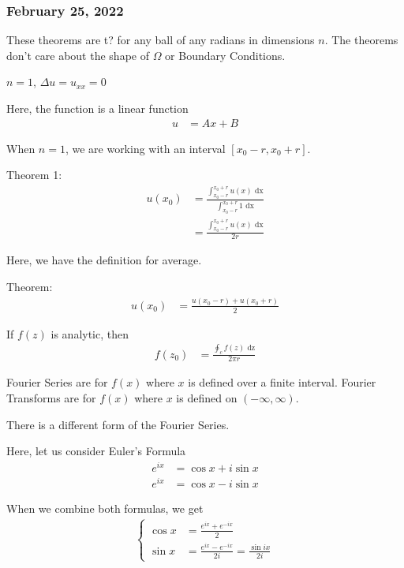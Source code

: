 \newpage

\subsubsection*{February 25, 2022}
\note These theorems are t? for any ball of any radians in dimensions $n$.
The theorems don't care about the shape of $\Omega$ or Boundary Conditions.

\ex $n = 1$, $\Delta u = u_{xx} = 0$

Here, the function is a linear function
%
\begin{align}
  u & = Ax + B
\end{align}

When $n = 1$, we are working with an interval $[x_0 - r, x_0 + r]$.

Theorem 1:
%
\begin{align}
  u(x_0) & = \frac
  {
    \int^{x_0 + r}_{x_0 - r} u(x) \text{ dx}
  }
  {
    \int^{x_0 + r}_{x_0 - r} 1 \text{ dx}
  }\\
  & = \frac
  {
    \int^{x_0 + r}_{x_0 - r} u(x) \text{ dx}
  }
  {
    2r
  }
\end{align}

Here, we have the definition for average.

Theorem:
%
\begin{align}
  u(x_0) & =
  \frac
  {
    u(x_0 - r) + u(x_0 + r)
  }
  {
    2
  }
\end{align}


If $f(z)$ is analytic, then
%
\begin{align}
  f(z_0) & =
  \frac
  {
    \oint_c f(z) \text{ dz}
  }
  {
    2 \pi r
  }
\end{align}

Fourier Series are for $f(x)$ where $x$ is defined over a finite interval.
Fourier Transforms are for $f(x)$ where $x$ is defined on $(-\infty, \infty)$.

There is a different form of the Fourier Series.

Here, let us consider Euler's Formula
%
\begin{align}
  e^{ix} & = \cos x + i \sin x\\
  e^{ix} & = \cos x - i \sin x
\end{align}

When we combine both formulas, we get
%
\begin{align}
  \begin{cases}
    \cos x& = \frac{e^{ix} + e^{-ix}}{2}\\
    \sin x & = \frac{e^{ix} - e^{-ix}}{2i} = \frac{\sin ix}{2i}
  \end{cases}
\end{align}

